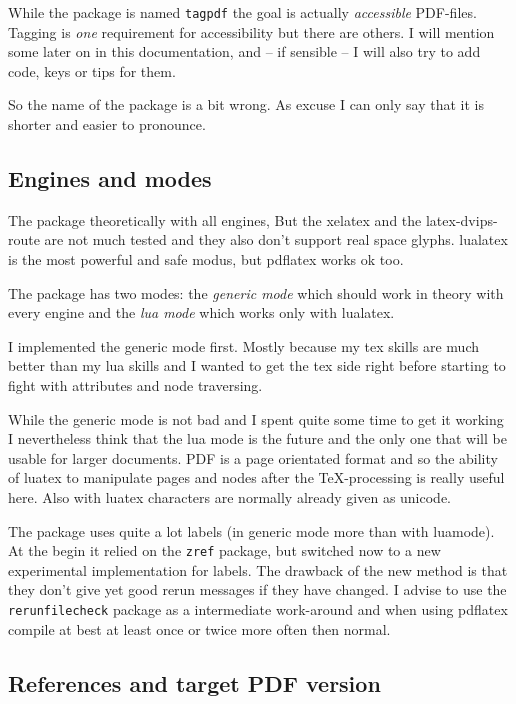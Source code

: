 \documentclass[DIV=12,parskip=half-,bibliography=totoc]{scrartcl}
\newcommand\pkg[1]{\texttt{#1}}
\newcommand\PDF{PDF}
\begin{document}
While the package is named \texttt{tagpdf} the goal is actually \emph{accessible} \PDF{}-files. Tagging is \emph{one} requirement for accessibility but there are others. I will mention some later on in this documentation, and -- if sensible -- I will also try to add code, keys or tips for them.

So the name of the package is a bit wrong. As excuse I can only say that it is shorter and easier to pronounce.


\subsection{Engines and modes}

The package theoretically with all engines,
But the xelatex and the latex-dvips-route are not much tested and they also don't support
real space glyphs. lualatex is the most powerful and safe modus, but pdflatex works ok too.

The package has two modes: the \emph{generic mode} which should work in theory with every engine and the \emph{lua mode} which works only with lualatex.

I implemented the generic mode first. Mostly because my tex skills are much better than my lua skills and I wanted to get the tex side right before starting to fight with attributes and node traversing.

While the generic mode is not bad and I spent quite some time to get it working I nevertheless think that the lua mode is the future and the only one that will be usable for larger documents. \PDF{} is a page orientated format and so the ability of luatex to manipulate pages and nodes after the \TeX-processing is really useful here. Also with luatex characters are normally already given as unicode.

The package uses quite a lot labels (in generic mode more than with luamode). At the begin it relied on the \pkg{zref} package, but switched now to a new experimental implementation for labels. The drawback of the new method is that they don't give yet good rerun messages if they have changed. I advise to use the \pkg{rerunfilecheck} package as a intermediate work-around and when using pdflatex compile
at best at least once or twice more often then normal.


\subsection{References and target PDF version}
\end{document}
